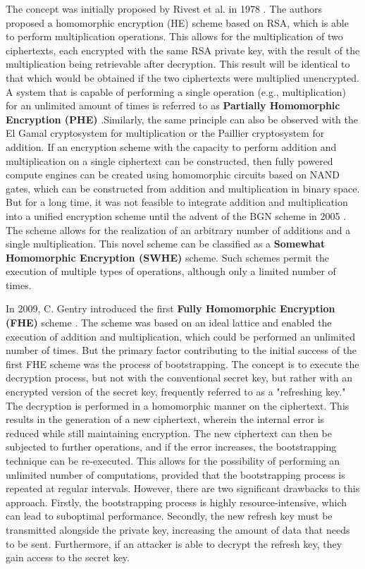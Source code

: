 The concept was initially proposed by Rivest et al. in 1978 \cite{Rivest1978}. The authors proposed a homomorphic encryption (HE) scheme based on RSA, which is able to perform multiplication operations. This allows for the multiplication of two ciphertexts, each encrypted with the same RSA private key, with the result of the multiplication being retrievable after decryption. This result will be identical to that which would be obtained if the two ciphertexts were multiplied unencrypted. A system that is capable of performing a single operation (e.g., multiplication) for an unlimited amount of times is referred to as \textbf{Partially Homomorphic Encryption (PHE)}  \cite{FheImplementations, SurveyOfHomomorphicEncryption}.Similarly, the same principle can also be observed with the El Gamal cryptosystem \cite{ElGamal} for multiplication or the Paillier cryptosystem \cite{Paillier} for addition. If an encryption scheme with the capacity to perform addition and multiplication on a single ciphertext can be constructed, then fully powered compute engines can be created using homomorphic circuits based on NAND gates, which can be constructed from addition and multiplication in binary space. \\
But for a long time, it was not feasible to integrate addition and multiplication into a unified encryption scheme until the advent of the BGN scheme in 2005 \cite{BGN}. The scheme allows for the realization of an arbitrary number of additions and a single multiplication. This novel scheme can be classified as a  \textbf{Somewhat Homomorphic Encryption (SWHE)}  scheme. Such schemes permit the execution of multiple types of operations, although only a limited number of times.

In 2009, C. Gentry introduced the first  \textbf{Fully Homomorphic Encryption (FHE)} scheme \cite{Gentry2009AFH}. The scheme was based on an ideal lattice and enabled the execution of addition and multiplication, which could be performed an unlimited number of times. But the primary factor contributing to the initial success of the first FHE scheme was the process of bootstrapping. The concept is to execute the decryption process, but not with the conventional secret key, but rather with an encrypted version of the secret key, frequently referred to as a "refreshing key." The decryption is performed in a homomorphic manner on the ciphertext. This results in the generation of a new ciphertext, wherein the internal error is reduced while still maintaining encryption. The new ciphertext can then be subjected to further operations, and if the error increases, the bootstrapping technique can be re-executed. This allows for the possibility of performing an unlimited number of computations, provided that the bootstrapping process is repeated at regular intervals. However, there are two significant drawbacks to this approach. Firstly, the bootstrapping process is highly resource-intensive, which can lead to suboptimal performance. Secondly, the new refresh key must be transmitted alongside the private key, increasing the amount of data that needs to be sent. Furthermore, if an attacker is able to decrypt the refresh key, they gain access to the secret key. 


